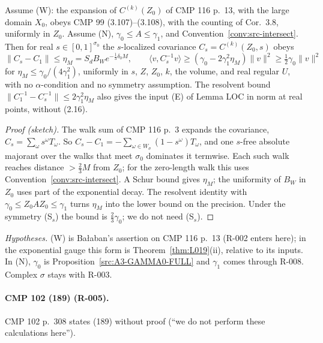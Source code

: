 \begin{proposition}\label{src:A3-SIGMA}
Assume (W): the expansion of $C^{(k)}(Z_0)$ of CMP 116 p.~13, with the large domain $X_0$, obeys CMP 99 (3.107)--(3.108), with the counting of Cor.~3.8, uniformly in $Z_0$. Assume (N), $\gamma_0\le A\le\gamma_1$, and Convention~\ref{conv:src-intersect}. Then for real $s\in[0,1]^{\sigma_0}$ the $s$-localized covariance $C_s=C^{(k)}(Z_0,s)$ obeys
\[
\|C_s-C_1\|\le\eta_M=S_dB_We^{-\frac13\delta_0M},\qquad\langle v,C_s^{-1}v\rangle\ge(\gamma_0-2\gamma_1^2\eta_M)\|v\|^2\ge\tfrac12\gamma_0\|v\|^2
\]
for $\eta_M\le\gamma_0/(4\gamma_1^2)$, uniformly in $s$, $Z$, $Z_0$, $k$, the volume, and real regular $U$, with no $\alpha$-condition and no symmetry assumption. The resolvent bound $\|C_1^{-1}-C_s^{-1}\|\le2\gamma_1^2\eta_M$ also gives the input (E) of Lemma LOC in norm at real points, without (2.16).
\end{proposition}
\begin{proof}[Proof (sketch)]
The walk sum of CMP 116 p.~3 expands the covariance, $C_s=\sum_\omega s^\omega T_\omega$. So $C_s-C_1=-\sum_{\omega\in W_\sigma}(1-s^\omega)T_\omega$, and one $s$-free absolute majorant over the walks that meet $\sigma_0$ dominates it termwise. Each such walk reaches distance $>\tfrac23M$ from $Z_0$; for the zero-length walk this uses Convention~\ref{conv:src-intersect}. A Schur bound gives $\eta_M$; the uniformity of $B_W$ in $Z_0$ uses part of the exponential decay. The resolvent identity with $\gamma_0\le Z_0AZ_0\le\gamma_1$ turns $\eta_M$ into the lower bound on the precision. Under the symmetry (S$_s$) the bound is $\tfrac23\gamma_0$; we do not need (S$_s$).
\end{proof}
\emph{Hypotheses.} (W) is Ba{\l}aban's assertion on CMP 116 p.~13 (R-002 enters here); in the exponential gauge this form is Theorem~\ref{thm:L019}(ii), relative to its inputs. In (N), $\gamma_0$ is Proposition~\ref{src:A3-GAMMA0-FULL} and $\gamma_1$ comes through R-008. Complex $\sigma$ stays with R-003.

\paragraph{CMP 102 (189) (R-005).}
CMP 102 p.~308 states (189) without proof (``we do not perform these calculations here'').

